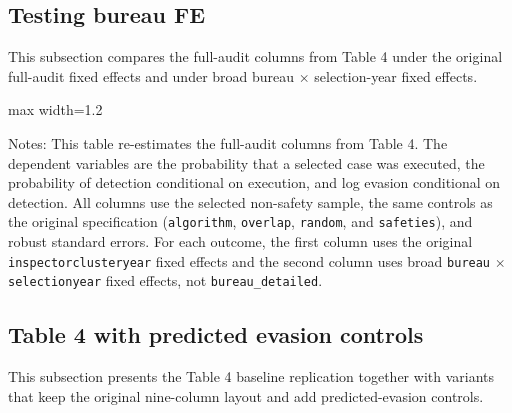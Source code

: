 \documentclass{article}
\newcommand{\OutPath}{Output/}%
\newcommand{\OutPath}{../Output/}%
\begin{document}
\subsection{Testing bureau FE}

This subsection compares the full-audit columns from Table 4 under the original full-audit fixed effects and under broad bureau $\times$ selection-year fixed effects.

\begin{table}[H]\centering
\begin{adjustbox}{max width=1.2\textwidth}
\begin{threeparttable}
\caption{Table 4 Full-Audit Columns: Bureau FE Comparison}
\label{tab:table4_fullaudit_fe_comparison}
\footnotesize

\begin{tablenotes}[flushleft]
\footnotesize
\item Notes: This table re-estimates the full-audit columns from Table 4. The dependent variables are the probability that a selected case was executed, the probability of detection conditional on execution, and log evasion conditional on detection. All columns use the selected non-safety sample, the same controls as the original specification (\texttt{algorithm}, \texttt{overlap}, \texttt{random}, and \texttt{safeties}), and robust standard errors. For each outcome, the first column uses the original \texttt{inspectorclusteryear} fixed effects and the second column uses broad \texttt{bureau} $\times$ \texttt{selectionyear} fixed effects, not \texttt{bureau\_detailed}.
\end{tablenotes}
\end{threeparttable}
\end{adjustbox}
\end{table}

\subsection{Table 4 with predicted evasion controls}

This subsection presents the Table 4 baseline replication together with variants that keep the original nine-column layout and add predicted-evasion controls.
\end{document}
